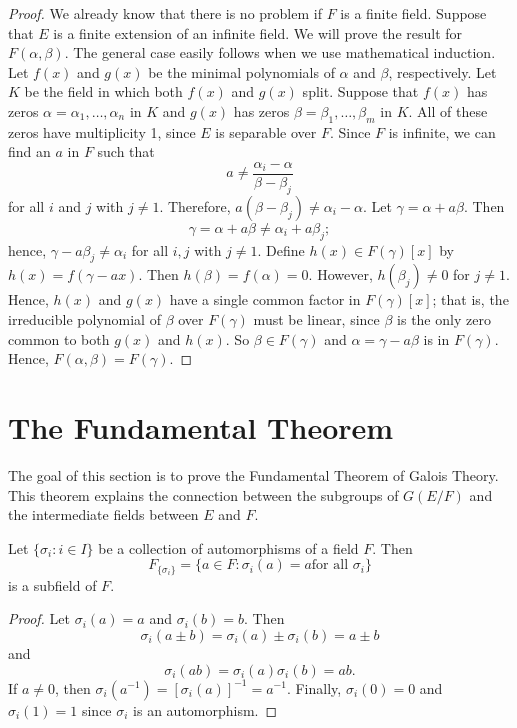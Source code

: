  
\begin{proof}
We already know that there is no problem if $F$ is a finite field. 
Suppose that $E$ is a finite extension of an infinite field. We will 
prove the result for $F(\alpha, \beta)$.  The general case easily
follows when we use mathematical induction. Let $f(x)$ and $g(x)$ be  the
minimal polynomials of $\alpha$ and $\beta$, respectively. Let $K$ be
the field in which both $f(x)$ and $g(x)$ split. Suppose that $f(x)$
has zeros $\alpha = \alpha_1, \ldots, \alpha_n$ in $K$ and $g(x)$ has
zeros $\beta = \beta_1, \ldots, \beta_m$ in $K$. All of these zeros
have multiplicity 1, since $E$ is separable over $F$. Since $F$ is
infinite, we can find an $a$ in $F$ such that  
\[
a \neq \frac{\alpha_i - \alpha}{\beta - \beta_j}
\]
for all $i$ and $j$ with $j \neq 1$. Therefore, $a( \beta - \beta_j ) 
\neq \alpha_i - \alpha$. Let $\gamma = \alpha +a \beta$. Then
\[
\gamma = \alpha + a \beta \neq \alpha_i + a \beta_j;
\]
hence, $\gamma - a \beta_j \neq \alpha_i$ for all $i, j$ with $j \neq 1$. 
Define $h(x) \in F( \gamma )[x]$ by $h(x) = f( \gamma - ax)$. Then $h(
\beta ) = f( \alpha ) = 0$. However, $h( \beta_j ) \neq 0$ for $j \neq
1$. Hence, $h(x)$ and $g(x)$ have a single common factor in $F( \gamma
)[x]$; that is, the irreducible polynomial of $\beta$ over $F( \gamma
)$ must be linear, since $\beta$ is the only zero common to both $g(x)$
and $h(x)$. So $\beta \in F( \gamma )$ and $\alpha = \gamma - a \beta$
is in $F( \gamma )$. Hence, $F( \alpha, \beta ) = F( \gamma )$. 
\end{proof}
 
 
 
\section{The Fundamental Theorem}
 
 
The goal of this section is to prove the Fundamental Theorem of	Galois 
Theory. This theorem explains the connection between the subgroups of 
$G(E/F)$ and the intermediate fields between $E$ and $F$.  
 
 
\begin{proposition}
Let $\{\sigma_i : i \in I  \}$ be a  collection of automorphisms of a
field $F$.  Then 
\[
F_{ \{\sigma_i \}    } = \{ a \in F : \sigma_i(a) = a \mbox{
for all $\sigma_i$}  \}\label{noteFixedfield}
\]
is a subfield of $F$.
\end{proposition}
 
 
\begin{proof}
Let $\sigma_i(a) = a$ and $\sigma_i(b)=b$. Then
\[
\sigma_i(a \pm b) = \sigma_i(a) \pm \sigma_i(b) = a \pm b
\]
and
\[
\sigma_i(a b) = \sigma_i(a) \sigma_i(b) = a  b.
\]
If $a \neq 0$, then  $\sigma_i(a^{-1}) = [\sigma_i(a)]^{-1} = a^{-1}$.
Finally, $\sigma_i(0) = 0$ and $\sigma_i(1)=1$ since $\sigma_i$ is an
automorphism.  
\end{proof}
 
